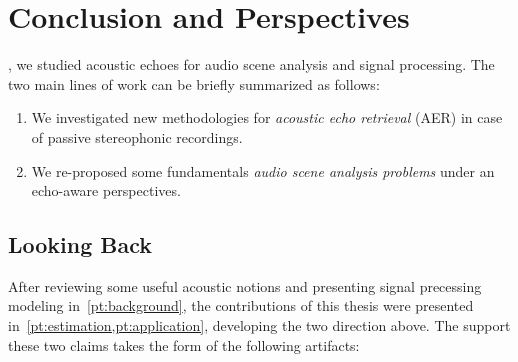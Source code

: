 \chapter{Conclusion and Perspectives}\label{ch:conclusion}

\vspace{-2.5em}
, we studied acoustic echoes for audio scene analysis and signal processing.
The two main lines of work can be briefly summarized as follows:
\begin{enumerate}[label=\Alph*.]
    \item We investigated new methodologies for \textit{acoustic echo retrieval} (AER) in case of passive stereophonic recordings.
    \item We re-proposed some fundamentals \textit{audio scene analysis problems} under an echo-aware perspectives.
\end{enumerate}

\section{Looking Back}
After reviewing some useful acoustic notions and presenting signal precessing modeling in~\cref{pt:background}, the contributions of this thesis were presented in~\cref{pt:estimation,pt:application},
developing the two direction above. The support these two claims takes the form of the following artifacts:

